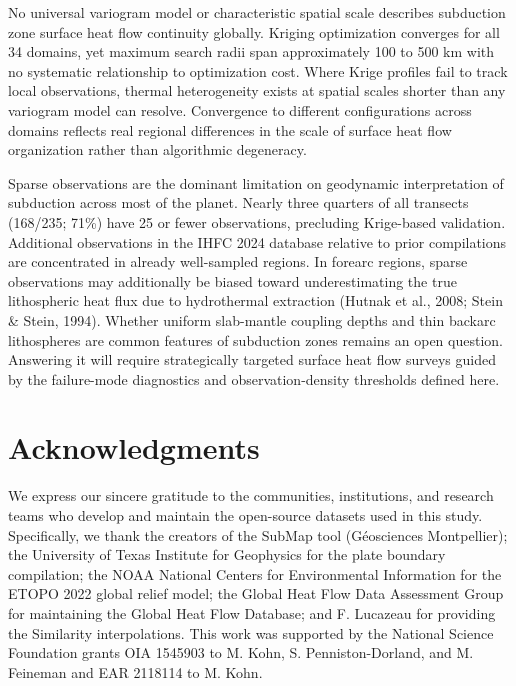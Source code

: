 \documentclass[draft,linenumbers]{agujournal2019}
\begin{document}
No universal variogram model or characteristic spatial scale describes
subduction zone surface heat flow continuity globally. Kriging
optimization converges for all 34 domains, yet maximum search radii span
approximately 100 to 500 km with no systematic relationship to
optimization cost. Where Krige profiles fail to track local
observations, thermal heterogeneity exists at spatial scales shorter
than any variogram model can resolve. Convergence to different
configurations across domains reflects real regional differences in the
scale of surface heat flow organization rather than algorithmic
degeneracy.

Sparse observations are the dominant limitation on geodynamic
interpretation of subduction across most of the planet. Nearly three
quarters of all transects (168/235; 71\%) have 25 or fewer observations,
precluding Krige-based validation. Additional observations in the IHFC
2024 database relative to prior compilations are concentrated in already
well-sampled regions. In forearc regions, sparse observations may
additionally be biased toward underestimating the true lithospheric heat
flux due to hydrothermal extraction (Hutnak et al., 2008; Stein \&
Stein, 1994). Whether uniform slab-mantle coupling depths and thin
backarc lithospheres are common features of subduction zones remains an
open question. Answering it will require strategically targeted surface
heat flow surveys guided by the failure-mode diagnostics and
observation-density thresholds defined here.

\clearpage

\section*{Acknowledgments}\label{sec:acknowledgements}

We express our sincere gratitude to the communities, institutions, and
research teams who develop and maintain the open-source datasets used in
this study. Specifically, we thank the creators of the SubMap tool
(Géosciences Montpellier); the University of Texas Institute for
Geophysics for the plate boundary compilation; the NOAA National Centers
for Environmental Information for the ETOPO 2022 global relief model;
the Global Heat Flow Data Assessment Group for maintaining the Global
Heat Flow Database; and F. Lucazeau for providing the Similarity
interpolations. This work was supported by the National Science
Foundation grants OIA 1545903 to M. Kohn, S. Penniston-Dorland, and M.
Feineman and EAR 2118114 to M. Kohn.
\end{document}
